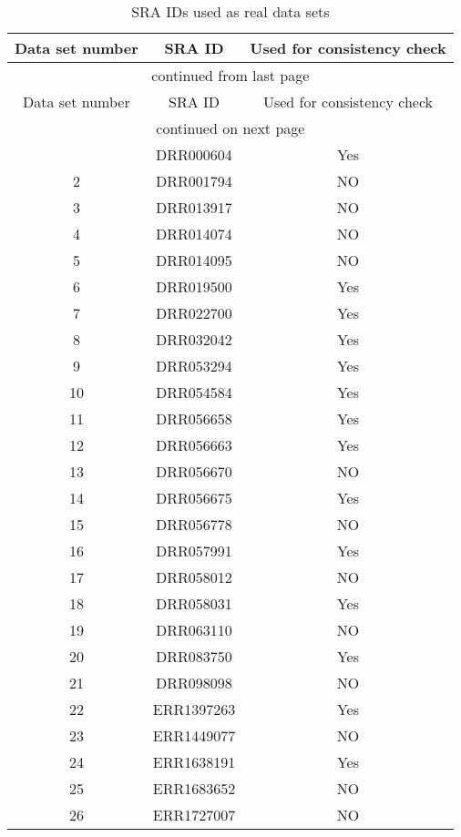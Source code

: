 \begin{longtable}{ccc}
\caption{SRA IDs used as real data sets} \\
\hline
Data set number & SRA ID & Used for consistency check \\
\hline
\endfirsthead %
\hline
\multicolumn{3}{c}{continued from last page}\\
Data set number & SRA ID & Used for consistency check \\
\hline
\endhead %
\hline
\multicolumn{3}{c}{continued on next page}\\
\hline
\endfoot
\endlastfoot
1 & DRR000604 & Yes \\ 
  2 & DRR001794 & NO \\ 
  3 & DRR013917 & NO \\ 
  4 & DRR014074 & NO \\ 
  5 & DRR014095 & NO \\ 
  6 & DRR019500 & Yes \\ 
  7 & DRR022700 & Yes \\ 
  8 & DRR032042 & Yes \\ 
  9 & DRR053294 & Yes \\ 
  10 & DRR054584 & Yes \\ 
  11 & DRR056658 & Yes \\ 
  12 & DRR056663 & Yes \\ 
  13 & DRR056670 & NO \\ 
  14 & DRR056675 & Yes \\ 
  15 & DRR056778 & NO \\ 
  16 & DRR057991 & Yes \\ 
  17 & DRR058012 & NO \\ 
  18 & DRR058031 & Yes \\ 
  19 & DRR063110 & NO \\ 
  20 & DRR083750 & Yes \\ 
  21 & DRR098098 & NO \\ 
  22 & ERR1397263 & Yes \\ 
  23 & ERR1449077 & NO \\ 
  24 & ERR1638191 & Yes \\ 
  25 & ERR1683652 & NO \\ 
  26 & ERR1727007 & NO \\ 

\end{longtable}
